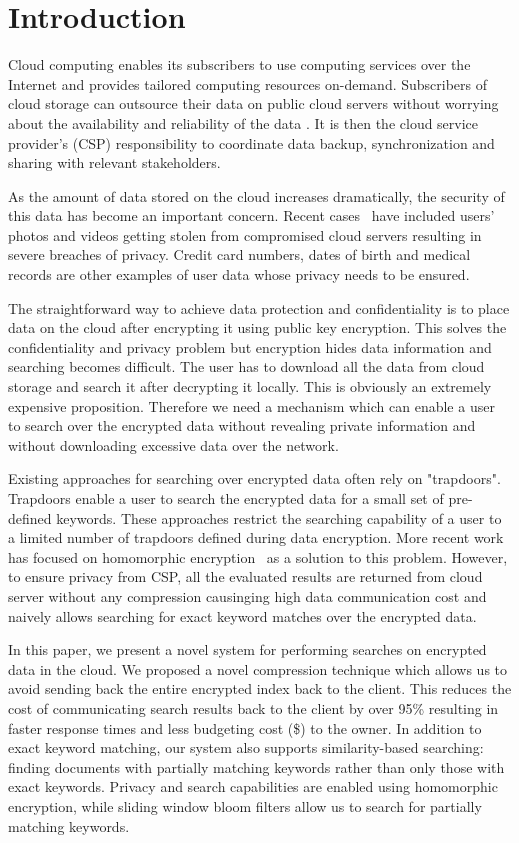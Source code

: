 \section{Introduction}

Cloud computing enables its subscribers to use computing services over the 
Internet and provides tailored computing resources on-demand. 
Subscribers of cloud storage can outsource their data on public cloud servers
without worrying about the availability and
reliability of the data \cite{5765928}. It is then the cloud service provider's (CSP) 
responsibility to coordinate data backup, synchronization and sharing
with relevant stakeholders. 

As the amount of data stored on the cloud increases dramatically, the security 
of this data has become an important concern. Recent cases~\cite{top_threats}
have included users' photos and videos getting stolen from compromised cloud servers resulting in
severe breaches of privacy. Credit card numbers, dates of birth and medical
records are other examples of user data whose privacy needs to be ensured.

The straightforward way to achieve data protection and confidentiality is to
place data on the cloud after encrypting it using public key encryption.
This solves the confidentiality and privacy problem
but encryption hides data information and searching becomes difficult. The user
has to download all the data from cloud storage and search it after decrypting it locally. This is
obviously an extremely expensive proposition. Therefore we need a mechanism 
which can enable a user to search over the encrypted data without revealing 
private information and without downloading excessive data over the network.

Existing approaches for searching over encrypted data often rely on
"trapdoors". Trapdoors enable a user to search the encrypted data for a small 
set of pre-defined keywords. These approaches restrict the searching
capability of a user to a limited number of trapdoors defined during data 
encryption. More recent work has focused on homomorphic encryption~\cite{craig} as a solution
to this problem. However, to ensure privacy from CSP, all the evaluated results
are returned from cloud server without any compression causinging high data
communication cost and naively allows searching for exact keyword matches over the encrypted data.

In this paper, we present a novel system for performing searches on encrypted 
data in the cloud. We proposed a novel compression technique which allows us to
avoid sending back the entire encrypted index back to the client. This reduces the cost of
communicating search results back to the client by over 95\% resulting in 
faster response times and less budgeting cost (\$) to the owner. In addition to exact keyword matching, our system also
supports similarity-based searching: finding documents with partially matching 
keywords rather than only those with exact keywords. Privacy and search 
capabilities are enabled using homomorphic encryption, while sliding window 
bloom filters allow us to search for partially matching keywords. 

